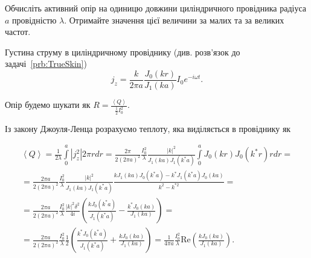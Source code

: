\begin{problem}
\begin{solution}
\begin{center}
\end{center}
\end{solution}
\end{problem}

\begin{problem}
    Обчисліть активний опір на одиницю довжини циліндричного провідника радіуса $a$ провідністю $\lambda$. Отримайте значення цієї величини за малих та за великих частот.
\begin{solution}
Густина струму в циліндричному провіднику (див. розв'язок до задачі~\ref{prb:TrueSkin})
\[
	j_z = \frac{k}{2\pi a} \frac{J_0(kr)}{J_1(ka)} I_0e^{-i\omega t}.
\]

Опір будемо шукати як $R = \frac{\left\langle Q \right\rangle }{\frac12I_0^2}$.


Із закону Джоуля-Ленца розрахуємо теплоту, яка виділяється в провіднику як%

\begin{multline*}
    \left\langle Q \right\rangle = \frac1{2\lambda}\int\limits_0^a \left| j_z^2\right| 2\pi r dr = \frac{2\pi}{2(2\pi a)^2} \frac{I_0^2}{\lambda} \frac{|k|^2}{J_1(ka)J_1(k^*a)}  \int\limits_0^a  J_0(kr)J_0(k^*r) r dr = \\
    = \frac{2\pi a}{2(2\pi a)^2} \frac{I_0^2}{\lambda} \frac{|k|^2}{J_1(ka)J_1(k^*a)} \frac{kJ_1(ka)J_0(k^*a) - k^*J_1(k^*a)J_0(ka)}{k^2-k^{*2}} =\\
    = \frac{2\pi a }{2(2\pi a)^2} \frac{I_0^2}{\lambda} \frac{|k|^2\delta^2}{4i}\left( \frac{kJ_0(k^*a)}{J_1(k^*a)} - \frac{k^*J_0(ka)}{J_1(ka)}\right) = \\ = \frac{2\pi a}{2(2\pi a)^2} \frac{I_0^2}{\lambda} \frac12  \left( \frac{k^*J_0(k^*a)}{J_1(k^*a)} + \frac{kJ_0(ka)}{J_1(ka)}\right) =  \frac{1}{4\pi a} \frac{I_0^2}{\lambda}  \mathrm{Re}\left(  \frac{kJ_0(ka)}{J_1(ka)} \right).
\end{multline*}


\end{solution}
\end{problem}
